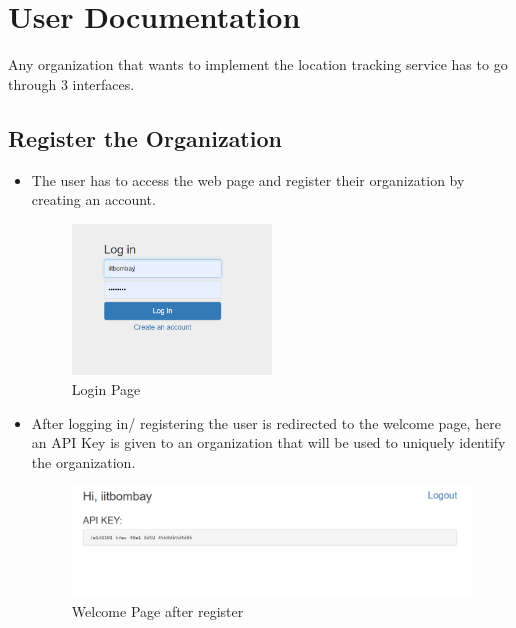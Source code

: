 \documentclass{article}
\begin{document}
\section{User Documentation}
Any organization that wants to implement the location tracking service has to go through 3 interfaces.
\subsection{Register the Organization}
\begin{itemize}
\item The user has to access the web page and register their organization by creating an account.
\begin{figure}[h]
\centering
    \includegraphics[width=0.5\textwidth]{images/Loginpage.PNG}
    \caption{Login Page}
\end{figure}
\item After logging in/ registering the user is redirected to the welcome page, here an API Key is given to an organization that will be used to uniquely identify the organization.
\begin{figure}[h]
    \centering
    \includegraphics[width=1.0\textwidth]{WebPage.PNG}
    \caption{Welcome Page after register}
\end{figure}



\end{itemize}

\newpage
\end{document}
